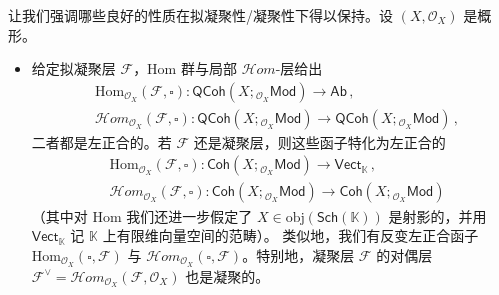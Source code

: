 \begin{Rem}\label{desirablecoherentprop}
让我们强调哪些良好的性质在拟凝聚性/凝聚性下得以保持。设 $(X,\mathcal{O}_X)$ 是概形。
\begin{itemize}[leftmargin=0.5cm]
	\item 给定拟凝聚层 $\mathcal{F}$，Hom 群与局部 $\mathcal{H}om$-层给出
	\begin{equation}\label{locHomonqcoh}
		\begin{aligned}
			&\text{Hom}_{\mathcal{O}_X}\!(\mathcal{F},\square):\mathsf{QCoh}(X;{}_{\mathcal{O}_X}\!\mathsf{Mod})\rightarrow \mathsf{Ab}\,, \\
			&\mathcal{H}om_{\mathcal{O}_X}\!(\mathcal{F},\square):\mathsf{QCoh}(X;{}_{\mathcal{O}_X}\!\mathsf{Mod})\rightarrow \mathsf{QCoh}(X;{}_{\mathcal{O}_X}\!\mathsf{Mod})\,, 
		\end{aligned}
	\end{equation}
	二者都是左正合的。若 $\mathcal{F}$ 还是凝聚层，则这些函子特化为左正合的
	\begin{equation}\label{locHomoncoh}
		\begin{aligned}
			&\text{Hom}_{\mathcal{O}_X}\!(\mathcal{F},\square):\mathsf{Coh}(X;{}_{\mathcal{O}_X}\!\mathsf{Mod})\rightarrow \mathsf{Vect}_\mathbb{K}\,, \\
			&\mathcal{H}om_{\mathcal{O}_X}\!(\mathcal{F},\square):\mathsf{Coh}(X;{}_{\mathcal{O}_X}\!\mathsf{Mod})\rightarrow \mathsf{Coh}(X;{}_{\mathcal{O}_X}\!\mathsf{Mod})
		\end{aligned}
	\end{equation}
	（其中对 Hom 我们还进一步假定了 $X\in\text{obj}(\mathsf{Sch}(\mathbb{K}))$ 是射影的，并用 $\mathsf{Vect}_\mathbb{K}$ 记 $\mathbb{K}$ 上有限维向量空间的范畴）。
	\newline 类似地，我们有反变左正合函子 $\text{Hom}_{\mathcal{O}_X}\!(\square,\mathcal{F})$ 与 $\mathcal{H}om_{\mathcal{O}_X}\!(\square,\mathcal{F})$。特别地，凝聚层 $\mathcal{F}$ 的对偶层 $\mathcal{F}^\vee=\mathcal{H}om_{\mathcal{O}_X}\!(\mathcal{F},\mathcal{O}_X)$ 也是凝聚的。
	

\end{itemize}
\end{Rem}
